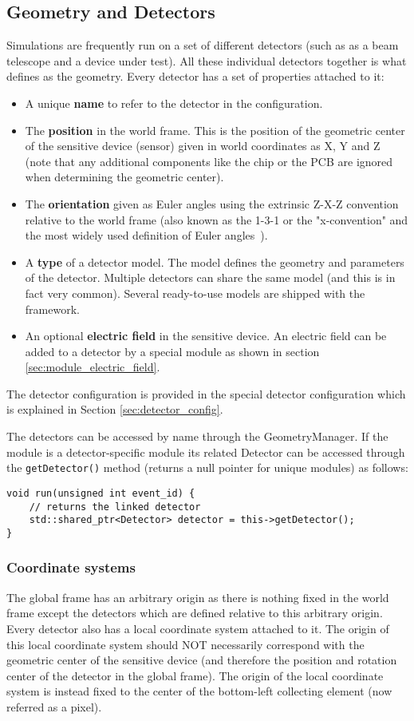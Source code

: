 \subsection{Geometry and Detectors}
\label{sec:models_geometry}
Simulations are frequently run on a set of different detectors (such as as a beam telescope and a device under test). All these individual detectors together is what \apsq defines as the geometry. Every detector has a set of properties attached to it:
\begin{itemize}
\item A unique \textbf{name} to refer to the detector in the configuration.
\item The \textbf{position} in the world frame. This is the position of the geometric center of the sensitive device (sensor) given in world coordinates as X, Y and Z (note that any additional components like the chip or the PCB are ignored when determining the geometric center).
\item The \textbf{orientation} given as Euler angles using the extrinsic Z-X-Z convention relative to the world frame (also known as the 1-3-1 or the "x-convention" and the most widely used definition of Euler angles~\cite{eulerangles}). 
\item A \textbf{type} of a detector model. The model defines the geometry and parameters of the detector. Multiple detectors can share the same model (and this is in fact very common). Several ready-to-use models are shipped with the framework.
\item An optional \textbf{electric field} in the sensitive device. An electric field can be added to a detector by a special module as shown in section \ref{sec:module_electric_field}.
\end{itemize}
The detector configuration is provided in the special detector configuration which is explained in Section \ref{sec:detector_config}.

The detectors can be accessed by name through the GeometryManager. If the module is a detector-specific module its related Detector can be accessed through the \texttt{getDetector()} method (returns a null pointer for unique modules) as follows:
\begin{verbatim}
void run(unsigned int event_id) {
    // returns the linked detector
    std::shared_ptr<Detector> detector = this->getDetector();
}
\end{verbatim}

\subsubsection{Coordinate systems}
The global frame has an arbitrary origin as there is nothing fixed in the world frame except the detectors which are defined relative to this arbitrary origin. Every detector also has a local coordinate system attached to it. The origin of this local coordinate system should NOT necessarily correspond with the geometric center of the sensitive device (and therefore the position and rotation center of the detector in the global frame). The origin of the local coordinate system is instead fixed to the center of the bottom-left collecting element (now referred as a pixel). 

